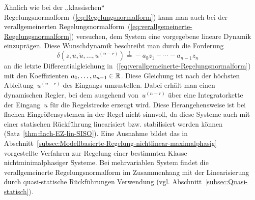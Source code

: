 Ähnlich wie bei der ,,klassischen`` Regelungsnormalform~(\ref{eq:Regelungsnormalform})
kann man auch bei der verallgemeinerten Regelungsnormalform~(\ref{eq:verallgemeinerte-Regelungsnormalform})
versuchen, dem System eine vorgegebene lineare Dynamik einzuprägen.
Diese Wunschdynamik beschreibt man durch die Forderung 
\[
\delta(z,u,\dot{u},\ldots,u^{(n-r)})\stackrel{!}{=}-a_{0}z_{1}-\cdots-a_{n-1}z_{n}
\]
an die letzte Differentialgleichung in~(\ref{eq:verallgemeinerte-Regelungsnormalform})
mit den Koeffizienten $a_{0},\ldots,a_{n-1}\in{\mathbb{R}}$. Diese Gleichung
ist nach der höchsten Ableitung~$u^{(n-r)}$ des Eingangs umzustellen.
Dabei erhält man einen dynamischen Regler, bei dem ausgehend von~$u^{(n-r)}$
über eine Integratorkette der Eingang~$u$ für die Regelstrecke erzeugt
wird. Diese Herangehensweise ist bei flachen Eingrößensystemen in
der Regel nicht sinnvoll, da diese Systeme auch mit einer statischen
Rückführung linearisiert bzw. stabilisiert werden können (Satz~\ref{thm:flach-EZ-lin-SISO}).
Eine Ausnahme bildet das in Abschnitt~\ref{subsec:Modellbasierte-Regelung-nichtlinear-maximalphasig}
vorgestellte Verfahren zur Regelung einer bestimmten Klasse nichtminimalphasiger
Systeme. Bei mehrvariablen System findet die verallgemeinerte Regelungsnormalform
im Zusammenhang mit der Linearisierung durch quasi-statische Rückführungen
Verwendung (vgl. Abschnitt~\ref{subsec:Quasi-statisch}). 


